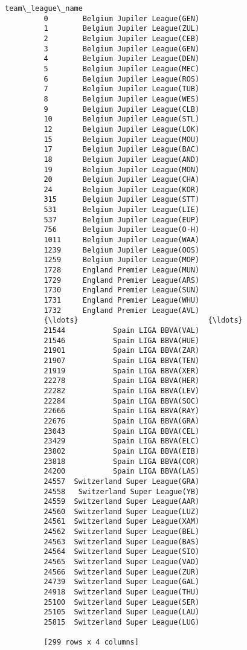 \documentclass[11pt]{article}
\begin{document}
\begin{Verbatim}[commandchars=\\\{\}]
                             team\_league\_name  
         0        Belgium Jupiler League(GEN)  
         1        Belgium Jupiler League(ZUL)  
         2        Belgium Jupiler League(CEB)  
         3        Belgium Jupiler League(GEN)  
         4        Belgium Jupiler League(DEN)  
         5        Belgium Jupiler League(MEC)  
         6        Belgium Jupiler League(ROS)  
         7        Belgium Jupiler League(TUB)  
         8        Belgium Jupiler League(WES)  
         9        Belgium Jupiler League(CLB)  
         10       Belgium Jupiler League(STL)  
         12       Belgium Jupiler League(LOK)  
         15       Belgium Jupiler League(MOU)  
         17       Belgium Jupiler League(BAC)  
         18       Belgium Jupiler League(AND)  
         19       Belgium Jupiler League(MON)  
         20       Belgium Jupiler League(CHA)  
         24       Belgium Jupiler League(KOR)  
         315      Belgium Jupiler League(STT)  
         531      Belgium Jupiler League(LIE)  
         537      Belgium Jupiler League(EUP)  
         756      Belgium Jupiler League(O-H)  
         1011     Belgium Jupiler League(WAA)  
         1239     Belgium Jupiler League(OOS)  
         1259     Belgium Jupiler League(MOP)  
         1728     England Premier League(MUN)  
         1729     England Premier League(ARS)  
         1730     England Premier League(SUN)  
         1731     England Premier League(WHU)  
         1732     England Premier League(AVL)  
         {\ldots}                              {\ldots}  
         21544           Spain LIGA BBVA(VAL)  
         21546           Spain LIGA BBVA(HUE)  
         21901           Spain LIGA BBVA(ZAR)  
         21907           Spain LIGA BBVA(TEN)  
         21919           Spain LIGA BBVA(XER)  
         22278           Spain LIGA BBVA(HER)  
         22282           Spain LIGA BBVA(LEV)  
         22284           Spain LIGA BBVA(SOC)  
         22666           Spain LIGA BBVA(RAY)  
         22676           Spain LIGA BBVA(GRA)  
         23043           Spain LIGA BBVA(CEL)  
         23429           Spain LIGA BBVA(ELC)  
         23802           Spain LIGA BBVA(EIB)  
         23818           Spain LIGA BBVA(COR)  
         24200           Spain LIGA BBVA(LAS)  
         24557  Switzerland Super League(GRA)  
         24558   Switzerland Super League(YB)  
         24559  Switzerland Super League(AAR)  
         24560  Switzerland Super League(LUZ)  
         24561  Switzerland Super League(XAM)  
         24562  Switzerland Super League(BEL)  
         24563  Switzerland Super League(BAS)  
         24564  Switzerland Super League(SIO)  
         24565  Switzerland Super League(VAD)  
         24566  Switzerland Super League(ZUR)  
         24739  Switzerland Super League(GAL)  
         24918  Switzerland Super League(THU)  
         25100  Switzerland Super League(SER)  
         25105  Switzerland Super League(LAU)  
         25815  Switzerland Super League(LUG)  
         
         [299 rows x 4 columns]
\end{Verbatim}
            
\end{document}
